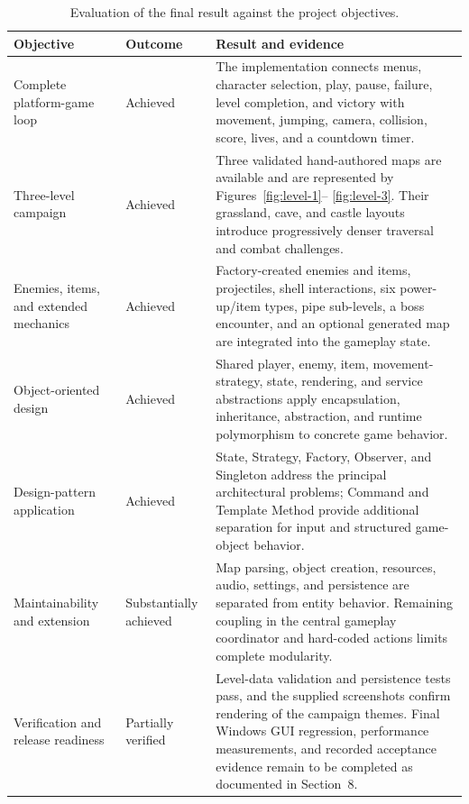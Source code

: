 \documentclass{template}
\begin{document}
\begin{table}[H]
    \centering
    \small
    \caption{Evaluation of the final result against the project objectives.}
    \label{tab:results-objectives}
    \begin{tabularx}{\textwidth}{@{}
        >{\raggedright\arraybackslash}p{}
        >{\raggedright\arraybackslash}p{}
        >{\raggedright\arraybackslash}X@{}}
        \toprule
        \textbf{Objective} & \textbf{Outcome} & \textbf{Result and evidence} \\
        \midrule
        Complete platform-game loop & Achieved & The implementation connects
        menus, character selection, play, pause, failure, level completion, and
        victory with movement, jumping, camera, collision, score, lives, and a
        countdown timer. \\
        Three-level campaign & Achieved & Three validated hand-authored maps are
        available and are represented by Figures~\ref{fig:level-1}--
        \ref{fig:level-3}. Their grassland, cave, and castle layouts introduce
        progressively denser traversal and combat challenges. \\
        Enemies, items, and extended mechanics & Achieved & Factory-created
        enemies and items, projectiles, shell interactions, six power-up/item
        types, pipe sub-levels, a boss encounter, and an optional generated map
        are integrated into the gameplay state. \\
        Object-oriented design & Achieved & Shared player, enemy, item,
        movement-strategy, state, rendering, and service abstractions apply
        encapsulation, inheritance, abstraction, and runtime polymorphism to
        concrete game behavior. \\
        Design-pattern application & Achieved & State, Strategy, Factory,
        Observer, and Singleton address the principal architectural problems;
        Command and Template Method provide additional separation for input and
        structured game-object behavior. \\
        Maintainability and extension & Substantially achieved & Map parsing,
        object creation, resources, audio, settings, and persistence are
        separated from entity behavior. Remaining coupling in the central
        gameplay coordinator and hard-coded actions limits complete modularity. \\
        Verification and release readiness & Partially verified & Level-data
        validation and persistence tests pass, and the supplied screenshots
        confirm rendering of the campaign themes. Final Windows GUI regression,
        performance measurements, and recorded acceptance evidence remain to be
        completed as documented in Section~8. \\
        \bottomrule
    \end{tabularx}
\end{table}
\end{document}
